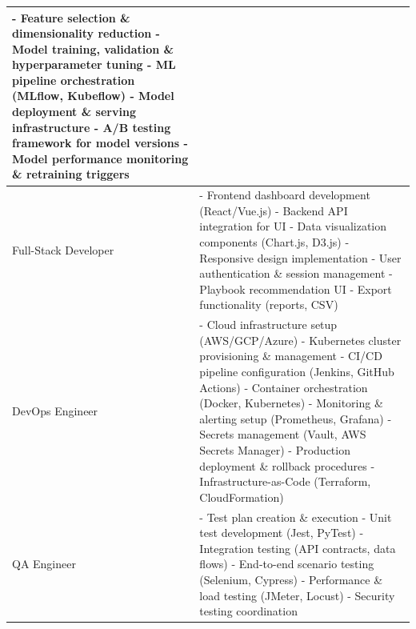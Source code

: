 \documentclass[12pt,a4paper]{article}
\begin{document}
\begin{longtable}{|p{3cm}|p{11cm}|}
- Feature selection \& dimensionality reduction \newline
- Model training, validation \& hyperparameter tuning \newline
- ML pipeline orchestration (MLflow, Kubeflow) \newline
- Model deployment \& serving infrastructure \newline
- A/B testing framework for model versions \newline
- Model performance monitoring \& retraining triggers \\
\hline
Full-Stack Developer & - Frontend dashboard development (React/Vue.js) \newline
- Backend API integration for UI \newline
- Data visualization components (Chart.js, D3.js) \newline
- Responsive design implementation \newline
- User authentication \& session management \newline
- Playbook recommendation UI \newline
- Export functionality (reports, CSV) \\
\hline
DevOps Engineer & - Cloud infrastructure setup (AWS/GCP/Azure) \newline
- Kubernetes cluster provisioning \& management \newline
- CI/CD pipeline configuration (Jenkins, GitHub Actions) \newline
- Container orchestration (Docker, Kubernetes) \newline
- Monitoring \& alerting setup (Prometheus, Grafana) \newline
- Secrets management (Vault, AWS Secrets Manager) \newline
- Production deployment \& rollback procedures \newline
- Infrastructure-as-Code (Terraform, CloudFormation) \\
\hline
QA Engineer & - Test plan creation \& execution \newline
- Unit test development (Jest, PyTest) \newline
- Integration testing (API contracts, data flows) \newline
- End-to-end scenario testing (Selenium, Cypress) \newline
- Performance \& load testing (JMeter, Locust) \newline
- Security testing coordination \newline

\end{longtable}
\end{document}
